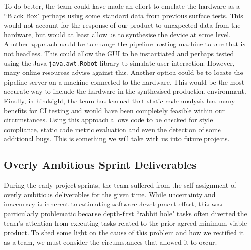 \documentclass{l3proj}
\begin{document}
To do better, the team could have made an effort to emulate the hardware as a ``Black Box" perhaps using some standard data from previous surface tests. This would not account for the response of our product to unexpected data from the hardware, but would at least allow us to synthesise the device at some level. Another approach could be to change the pipeline hosting machine to one that is not headless. This could allow the GUI to be instantiated and perhaps tested using the Java \verb|java.awt.Robot| library to simulate user interaction. However, many online resources advise against this\cite{ruiz}.
Another option could be to locate the pipeline server on a machine connected to the hardware. This would be the most accurate way to include the hardware in the synthesised production environment. Finally, in hindsight, the team has learned that static code analysis has many benefits for CI testing and would have been completely feasible within our circumstances. Using this approach allows code to be checked for style compliance, static code metric evaluation and even the detection of some additional bugs\cite{balachandran}. This is something we will take with us into future projects.

\subsection{Overly Ambitious Sprint Deliverables}
\label{subsection:over}
During the early project sprints, the team suffered from the self-assignment of overly ambitious deliverables for the given time. While uncertainty and inaccuracy is inherent to estimating software development effort\cite{ezghari}, this was particularly problematic because depth-first ``rabbit hole" tasks often diverted the team's attention from executing tasks related to the prior agreed minimum viable product. To shed some light on the cause of this problem and how we rectified it as a team, we must consider the circumstances that allowed it to occur.
\end{document}
